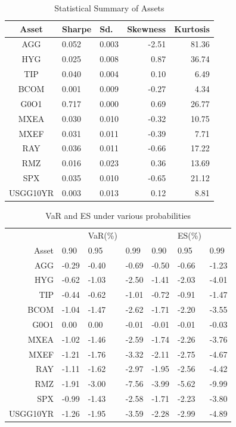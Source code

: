 \documentclass[12pt]{article}
\begin{document}
\begin{table}[!h]
\caption{Statistical Summary of Assets} %
\centering 
\begin{tabular}{ | c || p{1.5cm} p{1.2cm} r r | } 
 \hline
Asset & Sharpe  & Sd. & Skewness & Kurtosis \\
  \hline \hline
AGG & 0.052 & 0.003 & -2.51 & 81.36\\ 
HYG & 0.025 & 0.008 &  0.87 & 36.74\\ 
TIP & 0.040 & 0.004 &  0.10 &  6.49\\ 
BCOM & 0.001 & 0.009 & -0.27 &  4.34\\ 
G0O1 & 0.717 & 0.000 &  0.69 & 26.77\\ 
MXEA & 0.030 & 0.010 & -0.32 & 10.75\\ 
MXEF & 0.031 & 0.011 & -0.39 &  7.71\\ 
RAY & 0.036 & 0.011 & -0.66 & 17.22\\ 
RMZ & 0.016 & 0.023 &  0.36 & 13.69\\ 
SPX & 0.035 & 0.010 & -0.65 & 21.12\\ 
USGG10YR & 0.003 & 0.013 &  0.12 &  8.81\\
 \hline
\end{tabular}
\label{table:statSum}
\end{table}


\begin{table}[!h]
\caption{VaR and ES under various probabilities} %
\centering 
\begin{tabular}{ | r || p{1cm} p{1cm} p{1cm} || p{1cm} p{1cm} p{1cm} | } 
 \hline
 & & VaR(\%) &&& ES(\%) & \\
Asset& 0.90 & 0.95 & 0.99 & 0.90 & 0.95 & 0.99 \\
  \hline \hline
AGG & -0.29 & -0.40 & -0.69 & -0.50 & -0.66 & -1.23\\ 
HYG & -0.62 & -1.03 & -2.50 & -1.41 & -2.03 & -4.01\\ 
TIP & -0.44 & -0.62 & -1.01 & -0.72 & -0.91 & -1.47\\ 
BCOM & -1.04 & -1.47 & -2.62 & -1.71 & -2.20 & -3.55\\ 
G0O1 &  0.00 &  0.00 & -0.01 & -0.01 & -0.01 & -0.03\\ 
MXEA & -1.02 & -1.46 & -2.59 & -1.74 & -2.26 & -3.76\\ 
MXEF & -1.21 & -1.76 & -3.32 & -2.11 & -2.75 & -4.67\\ 
RAY & -1.11 & -1.62 & -2.97 & -1.95 & -2.56 & -4.42\\ 
RMZ & -1.91 & -3.00 & -7.56 & -3.99 & -5.62 & -9.99\\ 
SPX & -0.99 & -1.43 & -2.58 & -1.71 & -2.23 & -3.80\\ 
USGG10YR & -1.26 & -1.95 & -3.59 & -2.28 & -2.99 & -4.89\\
 \hline
\end{tabular}
\label{table:VaRES}
\end{table}
\end{document}
